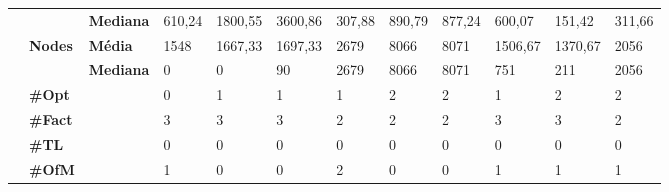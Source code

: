 \begin{footnotesize}
\begin{tabular}{c@{\hskip 0.2cm}l@{\hskip 0.1cm}l|lll|lll|lll}
 & & \textbf{Mediana} & 610,24 & 1800,55 & 3600,86 & 307,88 & 890,79 & 877,24 & 600,07 & 151,42 & 311,66 \\
\cline{2-12}
 & \multirow{2}{*}{\textbf{Nodes}} & \textbf{Média} & 1548 & 1667,33 & 1697,33 & 2679 & 8066 & 8071 & 1506,67 & 1370,67 & 2056 \\
 & & \textbf{Mediana} & 0 & 0 & 90 & 2679 & 8066 & 8071 & 751 & 211 & 2056 \\
\cline{2-12}
 & \textbf{\#Opt} & & 0 & 1 & 1 & 1 & 2 & 2 & 1 & 2 & 2 \\
 & \textbf{\#Fact} & & 3 & 3 & 3 & 2 & 2 & 2 & 3 & 3 & 2 \\
 & \textbf{\#TL} & & 0 & 0 & 0 & 0 & 0 & 0 & 0 & 0 & 0 \\
 & \textbf{\#OfM} & & 1 & 0 & 0 & 2 & 0 & 0 & 1 & 1 & 1 \\
	\end{tabular}
	\end{footnotesize}

